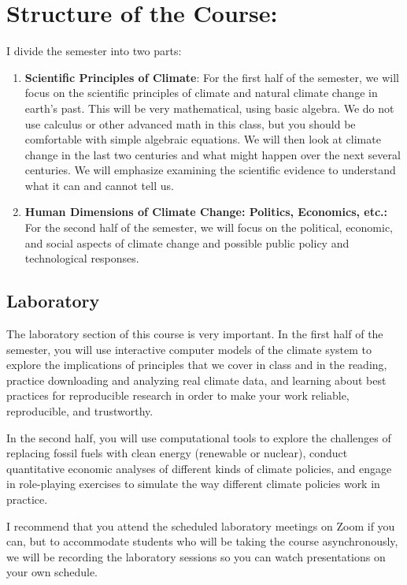 \documentclass[11pt,twoside]{jgsyllabus}\usepackage[]{graphicx}\usepackage[]{color}
\begin{document}
\section[Structure]{Structure of the Course:}
I divide the semester into two parts:
\begin{enumerate}
    \item \textbf{Scientific Principles of Climate}: For the first half of the
    semester, we will focus on the scientific principles of climate and natural
    climate change in earth's past. This will be very mathematical, using basic %
    algebra. We do not use calculus or other advanced math in this class, but
    you should be comfortable with simple algebraic equations.
    We will then look at climate change in the last two centuries and what might
    happen over the next several centuries. We will emphasize examining the
    scientific evidence to understand what it can and cannot tell us.
    \item \textbf{Human Dimensions of Climate Change: Politics, Economics, etc.:}
    For the second half of the semester, we will focus on the political,
    economic, and social aspects of climate change and possible public policy
    and technological responses.
\end{enumerate}
%
%
%
\subsection{Laboratory}
The laboratory section of this course is very important.
In the first half of the semester, you will use interactive computer models of
the climate system to explore the implications of principles that we cover in
class and in the reading, practice downloading and analyzing real climate data,
and learning about best practices for reproducible research in order to make
your work reliable, reproducible, and trustworthy.

In the second half, you will use computational tools to explore the challenges
of replacing fossil fuels with clean energy (renewable or nuclear), conduct
quantitative economic analyses of different kinds of climate policies, and
engage in role-playing exercises to simulate the way different climate policies
work in practice.

I recommend that you attend the scheduled laboratory meetings on Zoom if you
can, but to accommodate students who will be taking the course asynchronously,
we will be recording the laboratory sessions so you can watch presentations
on your own schedule.
\end{document}
